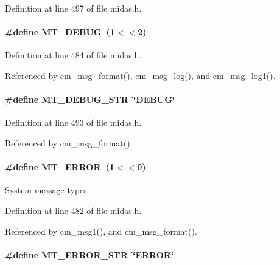 Definition at line 497 of file midas.h.
\paragraph[{MT\_\-DEBUG}]{\setlength{\rightskip}{0pt plus 5cm}\#define MT\_\-DEBUG~(1$<$$<$2)}\hfill\label{group__mdefineh_gad357af6d472b906b1e269f94f68c97b3}

\begin{DoxyItemize}
\item 
\end{DoxyItemize}

Definition at line 484 of file midas.h.

Referenced by cm\_\-msg\_\-format(), cm\_\-msg\_\-log(), and cm\_\-msg\_\-log1().
\paragraph[{MT\_\-DEBUG\_\-STR}]{\setlength{\rightskip}{0pt plus 5cm}\#define MT\_\-DEBUG\_\-STR~\char`\"{}DEBUG\char`\"{}}\hfill\label{group__mdefineh_ga7be2b9f727bf4de0b363c710701736b0}


Definition at line 493 of file midas.h.

Referenced by cm\_\-msg\_\-format().
\paragraph[{MT\_\-ERROR}]{\setlength{\rightskip}{0pt plus 5cm}\#define MT\_\-ERROR~(1$<$$<$0)}\hfill\label{group__mdefineh_gafb24605c905f91417535771185913d07}
System message types -\/ 

Definition at line 482 of file midas.h.

Referenced by cm\_\-msg1(), and cm\_\-msg\_\-format().
\paragraph[{MT\_\-ERROR\_\-STR}]{\setlength{\rightskip}{0pt plus 5cm}\#define MT\_\-ERROR\_\-STR~\char`\"{}ERROR\char`\"{}}\hfill\label{group__mdefineh_gafbd35a4befd9a2c892f37862d7da5fcd}


